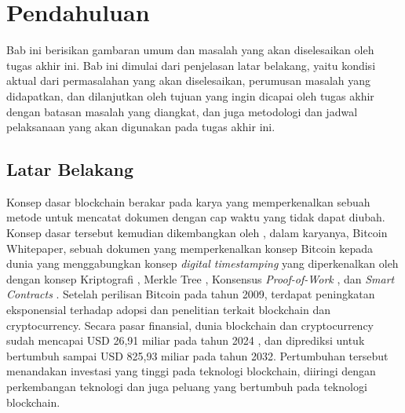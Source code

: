 \chapter{Pendahuluan}


Bab ini berisikan gambaran umum dan masalah yang akan diselesaikan oleh tugas akhir ini. Bab ini dimulai dari penjelasan latar belakang, yaitu kondisi aktual dari permasalahan yang akan diselesaikan, perumusan masalah yang didapatkan, dan dilanjutkan oleh tujuan yang ingin dicapai oleh tugas akhir dengan batasan masalah yang diangkat, dan juga metodologi dan jadwal pelaksanaan yang akan digunakan pada tugas akhir ini. 

\section{Latar Belakang}
\label{sec:latarbelakang}

Konsep dasar blockchain berakar pada karya \cite{haber1991time} yang memperkenalkan sebuah metode untuk mencatat dokumen dengan cap waktu yang tidak dapat diubah. Konsep dasar tersebut kemudian dikembangkan oleh \cite{nakamoto2008bitcoin}, dalam karyanya, Bitcoin Whitepaper, sebuah dokumen yang memperkenalkan konsep Bitcoin kepada dunia yang menggabungkan konsep \textit{digital timestamping} yang diperkenalkan oleh \cite{haber1991time} dengan konsep Kriptografi \parencite{hellman1976new} \parencite{standard1995secure}, Merkle Tree \parencite{merkle1987digital}, Konsensus \textit{Proof-of-Work} \parencite{dwork1992pricing}, dan \textit{Smart Contracts} \parencite{szabo1997formalizing}. Setelah perilisan Bitcoin pada tahun 2009, terdapat peningkatan eksponensial terhadap adopsi dan penelitian terkait blockchain dan cryptocurrency. Secara pasar finansial, dunia blockchain dan cryptocurrency sudah mencapai USD 26,91 miliar pada tahun 2024 \parencite{rosencrance2024top}, dan diprediksi untuk bertumbuh sampai USD 825,93 miliar pada tahun 2032. Pertumbuhan tersebut menandakan investasi yang tinggi pada teknologi blockchain, diiringi dengan perkembangan teknologi dan juga peluang yang bertumbuh pada teknologi blockchain. 

